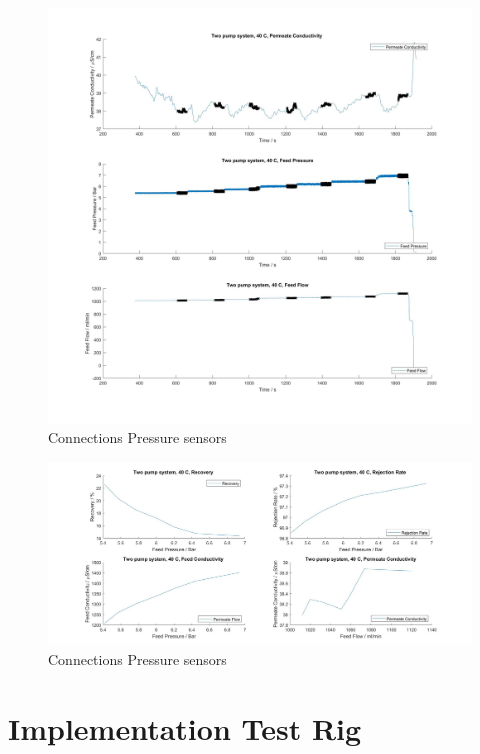 \begin{figure}[H]
    \centering
    \includegraphics[width=1.1\textwidth]{RecIncrease40}
    \caption{Connections Pressure sensors}
    \label{fig:PressConn}
\end{figure}

\begin{figure}[H]
    \centering
    \includegraphics[width=1.1\textwidth]{RecIncrease40Key}
    \caption{Connections Pressure sensors}
    \label{fig:PressConn}
\end{figure}



\section{Implementation Test Rig}


